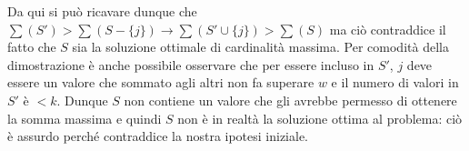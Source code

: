 \documentclass[../cheatSheetAlgoritmi.tex]{subfiles}
\begin{document}
Da qui si può ricavare dunque che $\sum(S') > \sum(S - \{j\}) \rightarrow \sum(S' \cup \{j\}) > \sum(S)$ ma ciò contraddice il fatto che $S$ sia la soluzione ottimale di cardinalità massima. Per comodità della dimostrazione è anche possibile osservare che per essere incluso in $S'$, $j$ deve essere un valore che sommato agli altri non fa superare $w$ e il numero di valori in $S'$ è $< k$. Dunque $S$ non contiene un valore che gli avrebbe permesso di ottenere la somma massima e quindi $S$ non è in realtà la soluzione ottima al problema: ciò è assurdo perché contraddice la nostra ipotesi iniziale.
\newpage
\end{document}

